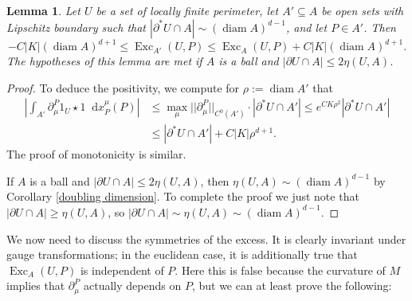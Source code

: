 \documentclass[reqno,10pt]{amsart}
\DeclareMathOperator{\diam}{diam}
\DeclareMathOperator{\Exc}{Exc}
\newcommand*\dif{\mathop{}\!\mathrm{d}}
\newtheorem{lemma}[theorem]{Lemma}
\theoremstyle{definition}
\numberwithin{equation}{section}
\begin{document}
\begin{lemma}
Let $U$ be a set of locally finite perimeter, let $A' \subseteq A$ be open sets with Lipschitz boundary such that $|\partial^* U \cap A| \sim (\diam A)^{d - 1}$,
and let $P \in A'$. Then
\begin{equation}\label{approximate monotone}
-C |K| (\diam A)^{d + 1} \leq \Exc_{A'}(U, P) \leq \Exc_A(U, P) + C |K|(\diam A)^{d + 1}.
\end{equation}
The hypotheses of this lemma are met if $A$ is a ball and $|\partial U \cap A| \leq 2\eta(U, A)$.
\end{lemma}
\begin{proof}
To deduce the positivity, we compute for $\rho := \diam A'$ that
\begin{align*}
    \left|\int_{A'} \partial^P_\mu 1_U \star 1 \dif x_P^\mu(P)\right|
 & \leq \max_\mu ||\partial^P_\mu||_{C^0(A')} \cdot |\partial^* U \cap A'| \leq e^{CK\rho^2} |\partial^* U \cap A'| \\
 & \leq |\partial^* U \cap A'| + C|K|\rho^{d + 1}.
\end{align*}
The proof of monotonicity is similar.

If $A$ is a ball and $|\partial U \cap A| \leq 2\eta(U, A)$, then $\eta(U, A) \sim (\diam A)^{d - 1}$ by Corollary \ref{doubling dimension}.
To complete the proof we just note that $|\partial U \cap A| \geq \eta(U, A)$, so $|\partial U \cap A| \sim \eta(U, A) \sim (\diam A)^{d - 1}$.
\end{proof}

We now need to discuss the symmetries of the excess.
It is clearly invariant under gauge transformations; in the euclidean case, it is additionally true that $\Exc_A(U, P)$ is independent of $P$.
Here this is false because the curvature of $M$ implies that $\partial_\mu^P$ actually depends on $P$, but we can at least prove the following:
\end{document}
